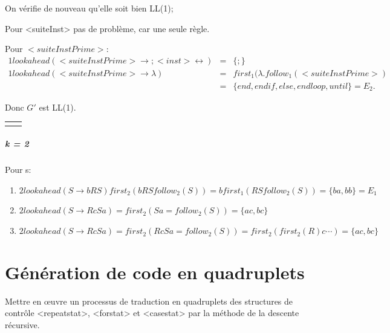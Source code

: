 \documentclass[12pt,a4paper,openany]{book}
\begin{document}
On vérifie de nouveau qu'elle soit bien LL(1);

Pour <suiteInst> pas de problème, car une seule règle.

Pour $<suiteInstPrime>$:
\begin{eqnarray*}
1lookahead(<suiteInstPrime> \rightarrow ; <inst> \leftrightarrow) &=& \{;\}\\
1lookahead(<suiteInstPrime> \rightarrow \lambda) &=&  first_1(\lambda.follow_1(<suiteInstPrime>) \\&=&  \{end, endif, else, endloop, until\} = E_2.
\end{eqnarray*}

Donc $G'$ est LL(1).

\begin{tabular}{ll}

&

\end{tabular}

\paragraph{k = 2}
Pour s:
\begin{enumerate}
	\item $2lookahead(S \rightarrow bRS) first_2 (bRS follow_2(S)) = b first_1(RS follow_2(S)) = \{ba,bb\} = E_1$
	\item $2lookahead(S \rightarrow RcSa) = first_2(Sa = follow_2(S)) = \{ac,bc\}$
	\item $2lookahead(S \rightarrow RcSa) = first_2(RcSa = follow_2(S)) = first_2(first_2(R)c\cdots) = \{ac,bc\}$
\end{enumerate}
\chapter{Génération de code en quadruplets}
Mettre en œuvre un processus de traduction en quadruplets des structures de contrôle <repeatstat>, <forstat> et <casestat> par la méthode de la
descente récursive.
\end{document}
